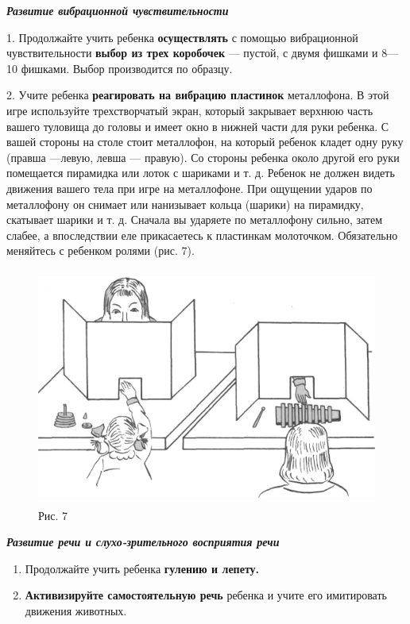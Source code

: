 \documentclass{book}
\renewcommand{\emph}[1]{\textit{#1}}
\begin{document}
\emph{\textbf{Развитие вибрационной чувствительности}}

1. Продолжайте учить ребенка \textbf{осуществлять} с помощью
вибрационной чувствительности \textbf{выбор из трех коробочек} ---
пустой, с двумя фишками и 8---10 фишками. Выбор производится по образцу.

2. Учите ребенка \textbf{реагировать на вибрацию пластинок} металлофона.
В этой игре используйте трехстворчатый экран, который закрывает верхнюю
часть вашего туловища до головы и имеет окно в нижней части для руки
ребенка. С вашей стороны на столе стоит металлофон, на который ребенок
кладет одну руку (правша ---левую, левша --- правую). Со стороны ребенка
около другой его руки помещается пирамидка или лоток с шариками и т. д.
Ребенок не должен видеть движения вашего тела при игре на металлофоне.
При ощущении ударов по металлофону он снимает или нанизывает кольца
(шарики) на пирамидку, скатывает шарики и т. д. Сначала вы ударяете по
металлофону сильно, затем слабее, а впоследствии еле прикасаетесь к
пластинкам молоточком. Обязательно меняйтесь с ребенком ролями (рис. 7).

\begin{figure}
\centering
\includegraphics[width=4.66667in,height=3.07361in]{media/media/image7.jpg}
\caption*{Рис. 7}
\end{figure}

\emph{\textbf{Развитие речи и слухо-зрительного восприятия речи}}

\begin{enumerate}
\def\labelenumi{\arabic{enumi}.}
\item
  
  Продолжайте учить ребенка \textbf{гулению и лепету.}
  
\item
  
  \textbf{Активизируйте самостоятельную речь} ребенка и учите его
  имитировать движения животных.
  
\end{enumerate}
\end{document}
